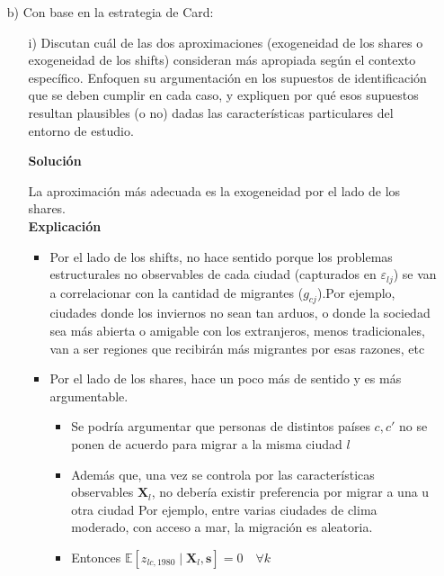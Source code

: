 \documentclass[a4paper, answers, addpoints, 11pt]{exam}
\newenvironment{solucion}{%
  \begin{mdframed}[
    backgroundcolor=blue!5,    %
    linecolor=blue!50,          %
    linewidth=2pt,              %
    leftmargin=10pt,            %
    rightmargin=8pt,           %
    topline=true,              %
    bottomline=true,            %
    roundcorner=10pt,           %
    innerleftmargin=10pt,       %
    innerrightmargin=10pt,      %
    innerbottommargin=10pt,     %
    innertopmargin=10pt         %
  ]%
  \begin{tcolorbox}[colframe=blue!50!black, colback=blue!50, coltitle=white, sharp corners=all, boxrule=1mm, width=\textwidth, halign=left, valign=center, top=0mm, bottom=0mm, left=0mm, right=0mm] \textbf{Solución} \end{tcolorbox} }{\end{mdframed}}
\begin{document}
\begin{itemize}

   

    \item[b)] Con base en la estrategia de Card:
    
    
     \begin{itemize}
         \item[i)] Discutan cuál de las dos aproximaciones (exogeneidad de los shares o exogeneidad de los shifts) consideran más apropiada según el contexto específico. Enfoquen su argumentación en los supuestos de identificación que se deben cumplir en cada caso, y expliquen por qué esos supuestos resultan plausibles (o no) dadas las características particulares del entorno de estudio. \\
        
         \begin{solucion}
         La aproximación más adecuada es la exogeneidad por el lado de los shares.\\
          \textbf{Explicación}{}
          \begin{itemize}
              \item Por el lado de los shifts, no hace sentido porque los problemas estructurales no observables de cada ciudad (capturados en $\varepsilon_{lj}$) se van a correlacionar con la cantidad de migrantes ($g_{cj}$).Por ejemplo, ciudades donde los inviernos no sean tan arduos, o donde la sociedad sea más abierta o amigable con los extranjeros, menos tradicionales, van a ser regiones que recibirán más migrantes por esas razones, etc
              \item Por el lado de los shares, hace un poco más de sentido y es más argumentable. 
              \begin{itemize}
              \item  Se podría argumentar que personas de distintos países $c, c'$ no se ponen de acuerdo para migrar a la misma ciudad $l$
              \item Además que, una vez se controla por las características observables $\boldsymbol{X}_l$, no debería existir preferencia por migrar a una u otra ciudad Por ejemplo, entre varias ciudades de clima moderado, con acceso a mar, la migración es aleatoria.
              \item Entonces $\mathbb{E}[z_{lc, 1980} \mid \boldsymbol{X}_l, \mathbf{s}] = 0 \quad \forall k$
              \end{itemize}
              

\end{itemize}
\end{solucion}
\end{itemize}
\end{itemize}
\end{document}
